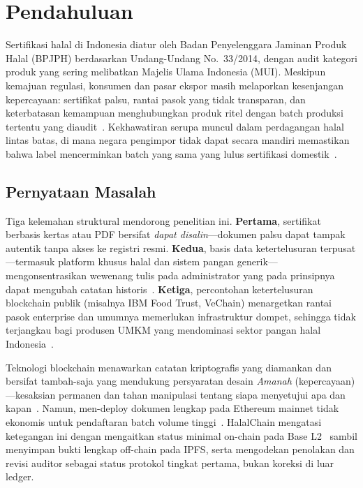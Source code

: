 \section{Pendahuluan}
\label{sec:intro}

Sertifikasi halal di Indonesia diatur oleh Badan Penyelenggara Jaminan Produk Halal (BPJPH) berdasarkan Undang-Undang No.~33/2014, dengan audit kategori produk yang sering melibatkan Majelis Ulama Indonesia (MUI).
Meskipun kemajuan regulasi, konsumen dan pasar ekspor masih melaporkan kesenjangan kepercayaan: sertifikat palsu, rantai pasok yang tidak transparan, dan keterbatasan kemampuan menghubungkan produk ritel dengan batch produksi tertentu yang diaudit~\cite{sidarto2021halal,rashid2018halal}.
Kekhawatiran serupa muncul dalam perdagangan halal lintas batas, di mana negara pengimpor tidak dapat secara mandiri memastikan bahwa label mencerminkan batch yang sama yang lulus sertifikasi domestik~\cite{marianingsih2024halal,rejeb2018halal}.

\subsection{Pernyataan Masalah}
Tiga kelemahan struktural mendorong penelitian ini.
\textbf{Pertama}, sertifikat berbasis kertas atau PDF bersifat \emph{dapat disalin}---dokumen palsu dapat tampak autentik tanpa akses ke registri resmi.
\textbf{Kedua}, basis data ketertelusuran terpusat---termasuk platform khusus halal dan sistem pangan generik---mengonsentrasikan wewenang tulis pada administrator yang pada prinsipnya dapat mengubah catatan historis~\cite{kshetri2018blockchain,underwood2016blockchain,viriyasitavat2019blockchain}.
\textbf{Ketiga}, percontohan ketertelusuran blockchain publik (misalnya IBM Food Trust, VeChain) menargetkan rantai pasok enterprise dan umumnya memerlukan infrastruktur dompet, sehingga tidak terjangkau bagi produsen UMKM yang mendominasi sektor pangan halal Indonesia~\cite{kamath2018blockchain,kamilaris2019blockchain}.

Teknologi blockchain menawarkan catatan kriptografis yang diamankan dan bersifat tambah-saja yang mendukung persyaratan desain \emph{Amanah} (kepercayaan)---kesaksian permanen dan tahan manipulasi tentang siapa menyetujui apa dan kapan~\cite{zheng2020overview,christidis2016blockchain}.
Namun, men-deploy dokumen lengkap pada Ethereum mainnet tidak ekonomis untuk pendaftaran batch volume tinggi~\cite{benet2014ipfs,rejeb2020blockchain}.
HalalChain mengatasi ketegangan ini dengan mengaitkan status minimal on-chain pada Base L2~\cite{base2024docs,optimism2024spec} sambil menyimpan bukti lengkap off-chain pada IPFS, serta mengodekan penolakan dan revisi auditor sebagai status protokol tingkat pertama, bukan koreksi di luar ledger.


